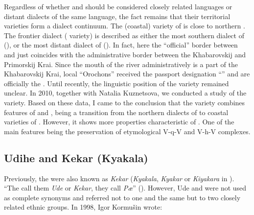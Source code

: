 \documentclass[output=paper,colorlinks,citecolor=brown]{langscibook}
\begin{document}
Regardless of whether  and  should be considered closely related languages or distant dialects of the same language, the fact remains that their territorial varieties form a dialect continuum. The  (coastal) variety of  is close to northern . The frontier dialect ( variety) is described as either the most southern dialect of  (\citealt{AvrorinLebedeva1978}), or the most distant dialect of  (\citealt{Kormushin1998}). In fact, here the “official” border between  and  just coincides with the administrative border between the Khabarovskij and Primorskij Krai. Since the mouth of the  river administratively is a part of the Khabarovskij Krai, local “Orochons” received the passport designation “” and are officially the .
Until recently, the linguistic position of the  variety remained unclear. In 2010, together with Natalia Kuznetsova, we conducted a study of the  variety. Based on these data, I came to the conclusion that the  variety combines features of  and , being a transition from the northern dialects of  to coastal varieties of . However, it shows more properties characteristic of . One of the main features being the preservation of etymological V-q-V and V-h-V complexes.


\subsection{Udihe and Kekar (Kyakala)}\largerpage

Previously, the  were also known as \textit{Kekar} (\textit{Kyakala}, \textit{Kyakar} or \textit{Kiyakara} in ). “The  call them \textit{Ude} or \textit{Kekar}, they call  \textit{Pæ}” (\citealt{Emelianov1927}). However, Ude and  were not used as complete synonyms and referred not to one and the same but to two closely related ethnic groups. In 1998, Igor Kormušin wrote:
\end{document}
